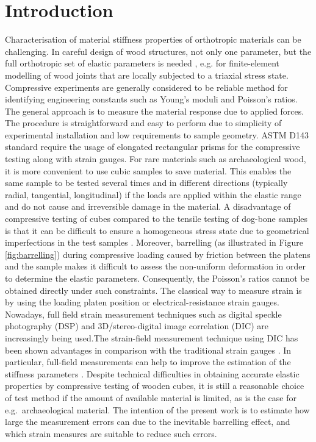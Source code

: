 \documentclass[3p]{elsarticle}
\begin{document}
\linenumbers

\section{Introduction}

Characterisation of material stiffness properties of orthotropic materials can
be challenging. In  careful design of wood structures, not only one parameter,
but the full orthotropic set of elastic parameters is needed \cite{tsoumis1991science},
e.g. for finite-element modelling of wood joints that are locally subjected to a
triaxial stress state. Compressive experiments are generally considered to be
reliable method for identifying engineering constants such as Young's moduli and Poisson's ratios. The general approach is to measure the material response due to applied
forces. The procedure is straightforward and easy to perform due to simplicity of experimental installation and low requirements to sample
geometry. ASTM D143 standard \cite{standard1997d143,
johnson1983compression} require the usage of elongated rectangular prisms for
the compressive testing along with strain gauges.
For rare materials such as archaeological wood, it is more convenient to use
cubic samples \cite{ljungdahl2007transverse, vorobyevcharacterisation} to save
material.
This enables the same sample to be tested several times and in
different directions (typically radial, tangential, longitudinal) if the loads are
applied within the elastic range and do not cause and irreversible damage in the material.
A disadvantage of compressive testing of cubes compared to the tensile testing
of dog-bone samples is that it can be difficult to ensure a homogeneous stress
state due to geometrical imperfections in the test samples
\cite{Toftegaard1999849}.
Moreover, barrelling  (as illustrated in Figure \ref{fig:barrelling}) during
compressive loading \cite{oldroyd1966stress} caused by friction between the platens and the
sample makes it difficult to assess the non-uniform deformation in order to
determine the elastic parameters.
Consequently, the Poisson's ratios cannot be obtained directly under such constraints. 
The classical way to measure strain is by using the loading platen position or electrical-resistance strain gauges. Nowadays, full field strain measurement techniques such
as digital speckle photography (DSP) \cite{synnergren1999stereoscopic} and
3D/stereo-digital image correlation (DIC) \cite{majano2012test} are 
increasingly being used.The strain-field measurement technique using
DIC has been shown advantages in comparison with the traditional strain gauges
\cite{huang2010optical,xavier2012stereovision}. In particular, full-field measurements can help to improve the estimation of the stiffness parameters \cite{dahl2009planar,
majano2012test, ozyhar2013moisture}. 
Despite technical difficulties in obtaining accurate elastic properties by compressive testing of wooden cubes, it is still a reasonable 
choice of test method if the amount of available material is limited, as is the case for e.g.\ archaeological material. The intention of the present work is to estimate how large the measurement errors can due to the inevitable barrelling effect, and which strain measures are suitable to reduce such errors.  \par 
\end{document}
